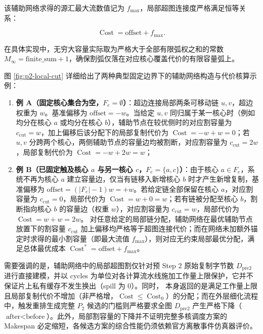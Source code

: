 \documentclass[anonymous,withtoc]{gmcm2026}
\providecommand{\tightlist}{\setlength{\itemsep}{0pt}\setlength{\parskip}{0pt}}
\begin{document}
该辅助网络求得的源汇最大流数值记为 \(f_{\max}\)，局部超图连接度严格满足恒等关系：

\begin{equation}
\operatorname{Cost} = \text{offset} + f_{\max}.
\end{equation}

在具体实现中，无穷大容量实际取为严格大于全部有限弧权之和的常数 \(M_\infty = \text{finite\_sum} + 1\)，确保割弧仅落在对应核心覆盖代价的有限容量弧上。

图 \ref{fig:p2-local-cut} 详细给出了两种典型固定边界下的辅助网络构造与代价核算示例：

\begin{enumerate}
\def\labelenumi{\arabic{enumi}.}
\tightlist
\item
  \textbf{例 A（固定核心集合为空，\(F_e = \emptyset\)）}：超边连接局部两条可移动链 \(u, v\)，超边权重为 \(w\)。基准偏移为 \(\text{offset} = -w\)。当给定 \(u, v\) 同归属于某一核心时（例如均分在核心 \(a\) 或均分在核心 \(b\)），辅助节点在较优侧时的对应割容量为 \(c_{\mathrm{cut}} = w\)，加上偏移后该分配下的局部复制代价为 \(\operatorname{Cost} = -w + w = 0\)；若 \(u, v\) 分跨两个核心，两侧辅助节点的容量边均被割断，对应割容量为 \(c_{\mathrm{cut}} = 2w\)，局部复制代价为 \(\operatorname{Cost} = -w + 2w = w\)；
\item
  \textbf{例 B（已固定触及核心 \(a\) 与另一核心 \(c\)，\(F_e = \{a, c\}\)）}：由于核心 \(a \in F_e\)，系统不再为核心 \(a\) 建立容量边，仅当有链移入新增核心 \(b\) 时才产生新增复制，基准偏移为 \(\text{offset} = (|F_e| - 1)w = +w\)。若给定链全部保留在核心 \(a\)，对应割容量为 \(c_{\mathrm{cut}} = 0\)，局部代价为 \(\operatorname{Cost} = w + 0 = w\)；若有链被分配至核心 \(b\)，割断指向核心 \(b\) 的容量边（权重 \(w\)），对应割容量为 \(c_{\mathrm{cut}} = w\)，局部代价为 \(\operatorname{Cost} = w + w = 2w\)。 对任意给定的局部链分配，辅助网络在最优辅助节点放置下的割容量 \(c_{\mathrm{cut}}\) 加上偏移均严格等于超图连接代价；而在网络未加额外锚定时求得的最小割容量（即最大流值 \(f_{\max}\)），则对应无约束局部最优分配，满足总体最优成本 \(\operatorname{Cost}^* = \text{offset} + f_{\max}\)。
\end{enumerate}

需要强调的是，辅助网络中的局部超图割仅针对预 Step 2 原始复制字节数 \(D_{\mathrm{pre2}}\) 进行直接建模，并以 cycles 为单位对各计算流水线施加工作量上限保护，它并不保证片上私有缓存不发生换出（spill 为 0）。同时，\texttt{} 本身返回的是满足工作量上限且局部复制代价不增加（非严格增，\(\operatorname{Cost} \le \operatorname{Cost}_0\)）的分配；而在外层细化流程 \texttt{} 中，触发重排生成完整 \(P_2\) 候选的门槛则严格要求全图 \(D_{\mathrm{pre2}}\) 产生严格下降（\(\text{after} < \text{before}\)）。此外，局部割容量的下降并不证明完整多核调度方案的 Makespan 必定缩短，各候选方案的综合性能仍须依赖官方离散事件仿真器评价。
\end{document}
